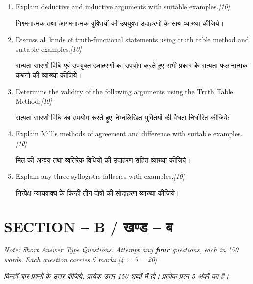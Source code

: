 \documentclass[11pt,a4paper]{article}
\newcommand{\pts}[1]{\hfill \textit{[#1]}}
\begin{document}
\begin{enumerate}[label=\textbf{\arabic*.},leftmargin=*,itemsep=12pt]

  \item Explain deductive and inductive arguments with suitable examples.\pts{10}
  
  निगमनात्मक तथा आगमनात्मक युक्तियों की उपयुक्त उदाहरणों के साथ व्याख्या कीजिये।

  \item Discuss all kinds of truth-functional statements using truth table method and suitable examples.\pts{10}
  
  सत्यता सारणी विधि एवं उपयुक्त उदाहरणों का उपयोग करते हुए सभी प्रकार के सत्यता-फलानात्मक कथनों की व्याख्या कीजिये।

  \item Determine the validity of the following arguments using the Truth Table Method:\pts{10}
  
  सत्यता सारणी विधि का उपयोग करते हुए निम्नलिखित युक्तियों की वैधता निर्धारित कीजिये:

  \item Explain Mill's methods of agreement and difference with suitable examples.\pts{10}
  
  मिल की अन्वय तथा व्यतिरेक विधियों की उदाहरण सहित व्याख्या कीजिये।

  \item Explain any three syllogistic fallacies with examples.\pts{10}
  
  निरपेक्ष न्यायवाक्य के किन्हीं तीन दोषों की सोदाहरण व्याख्या कीजिये।

\end{enumerate}

\bigskip

\section*{SECTION -- B / खण्ड -- ब}
\noindent \textit{Note: Short Answer Type Questions. Attempt any \textbf{four} questions, each in 150 words. Each question carries 5 marks.}\pts{4 $\times$ 5 = 20}

\noindent \textit{किन्हीं चार प्रश्नों के उत्तर दीजिये, प्रत्येक उत्तर 150 शब्दों में हो। प्रत्येक प्रश्न 5 अंकों का है।}
\end{document}
